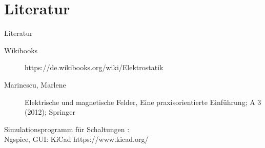 \documentclass[aspectratio=169, ignorenonframetext]{beamer}
\begin{document}
\part{Literatur}
\begin{frame}{Literatur}
\begin{description}
  \item[Wikibooks] https://de.wikibooks.org/wiki/Elektrostatik
  \item[Marinescu, Marlene]  Elektrische und magnetische Felder,
  Eine praxisorientierte Einführung; A 3 (2012); Springer
\end{description}
Simulationsprogramm für Schaltungen :\\Ngspice, GUI: KiCad https://www.kicad.org/
\end{frame}

  \listoffigures


  \label{LastPage}
\end{document}
